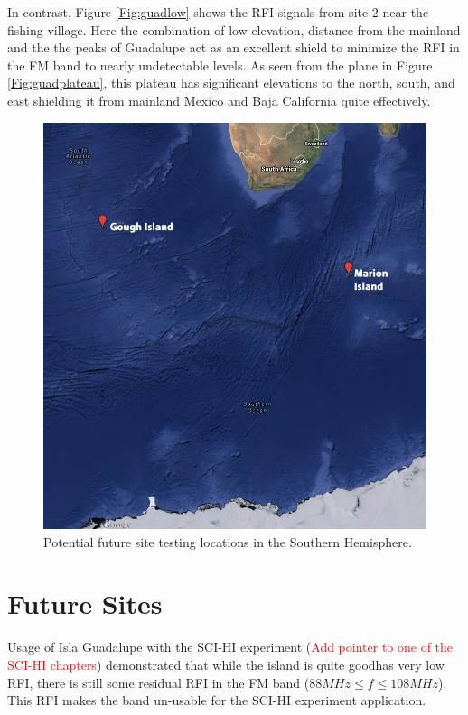 In contrast, Figure \ref{Fig:guadlow} shows the RFI signals from site 2 near the fishing village. Here the combination of low elevation, distance from the mainland and the the peaks of Guadalupe act as an excellent shield to minimize the RFI in the FM band to nearly undetectable levels. As seen from the plane in Figure \ref{Fig:guadplateau}, this plateau has significant elevations to the north, south, and east shielding it from mainland Mexico and Baja California quite effectively. 

\begin{figure}[htb]
\begin{center}
\includegraphics[width=0.9\linewidth]{RFI_testing/figures/site_testing_south.jpg}
\caption{Potential future site testing locations in the Southern Hemisphere.}
\label{Fig:site_map_south}
\end{center}
\end{figure}

\section{Future Sites}
Usage of Isla Guadalupe with the SCI-HI experiment (\textcolor{red}{Add pointer to one of the SCI-HI chapters}) demonstrated that while the island is quite goodhas very low RFI, there is still some residual RFI in the FM band ($88 MHz \leq f \leq 108 MHz$). This RFI makes the band un-usable for the SCI-HI experiment application. 

